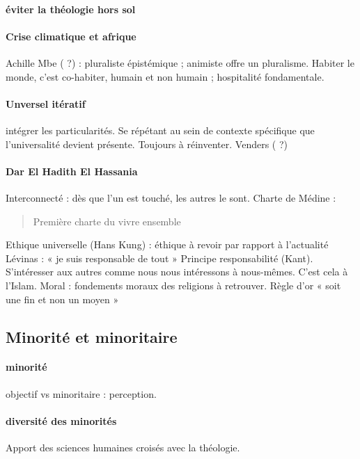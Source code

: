 \paragraph{éviter la théologie hors sol} 

\paragraph{Crise climatique et afrique} Achille Mbe ( ?) : pluraliste épistémique ; animiste offre un pluralisme. Habiter le monde, c’est co-habiter, humain et non humain ; hospitalité fondamentale. 

\paragraph{Unversel itératif} intégrer les particularités. Se répétant au sein de contexte spécifique que l’universalité devient présente. Toujours  à réinventer. Venders ( ?)

\paragraph{Dar El Hadith El Hassania} Interconnecté : dès que l’un est touché, les autres le sont.
Charte de Médine : 
\begin{quote}
Première charte du vivre ensemble
\end{quote}
Ethique universelle (Hans Kung) : éthique à revoir par rapport à l’actualité
Lévinas : « je suis responsable de tout »
Principe responsabilité (Kant). S’intéresser aux autres comme nous nous intéressons à nous-mêmes. C’est cela à l’Islam. 
Moral : fondements moraux des religions à retrouver.
Règle d’or « soit une fin et non un moyen »

\subsection{Minorité et minoritaire}

\paragraph{minorité} objectif vs minoritaire : perception. 

\paragraph{diversité des minorités} Apport des sciences humaines croisés avec la théologie. 

